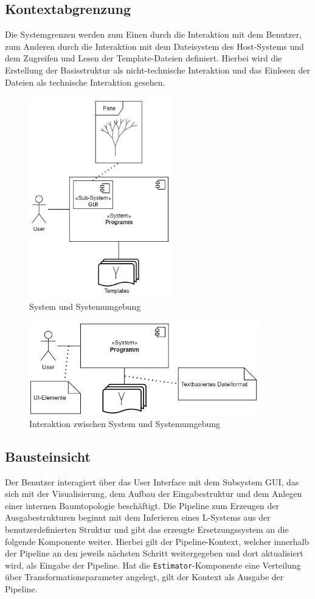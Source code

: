 \newpage

\subsection*{Kontextabgrenzung}
Die Systemgrenzen werden zum Einen durch die Interaktion mit dem Benutzer, zum Anderen durch die Interaktion mit
dem Dateisystem des Host-Systems und dem Zugreifen und Lesen der Template-Dateien definiert.
Hierbei wird die Erstellung der Basisstruktur als nicht-technische Interaktion und das Einlesen der Dateien als
technische Interaktion gesehen.
\begin{figure}[H]
    \centering
    \includegraphics[width=6.2cm]{../images/Fachlicher_Kontext.PNG}
    \caption{System und Systemumgebung}
\end{figure}
\begin{figure}[H]
    \centering
    \includegraphics[width=10cm]{../images/Technischer_Kontext.PNG}
    \caption{Interaktion zwischen System und Systemumgebung}
\end{figure}

\subsection*{Bausteinsicht}
Der Benutzer interagiert über das User Interface mit dem Subsystem GUI, das sich mit der Visualisierung, dem Aufbau der
Eingabestruktur und dem Anlegen einer internen Baumtopologie beschäftigt.
Die Pipeline zum Erzeugen der Ausgabestrukturen beginnt mit dem Inferieren eines L-Systems aus der benutzerdefinierten
Struktur und gibt das erzeugte Ersetzungssystem an die folgende Komponente weiter.
Hierbei gilt der Pipeline-Kontext, welcher innerhalb der Pipeline an den jeweils nächsten Schritt weitergegeben und
dort aktualisiert wird, als Eingabe der Pipeline.
Hat die \texttt{Estimator}-Komponente eine Verteilung über Transformationsparameter angelegt, gilt der Kontext als
Ausgabe der Pipeline.

